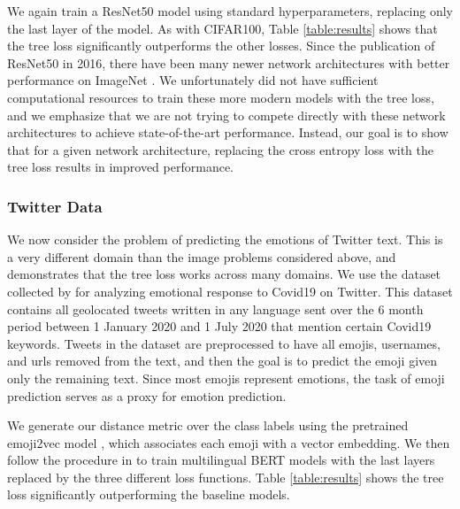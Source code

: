 \documentclass[twoside]{article}
\begin{document}
We again train a ResNet50 model \citep{He2016DeepRL} using standard hyperparameters, replacing only the last layer of the model.
As with CIFAR100, Table \ref{table:results} shows that the tree loss significantly outperforms the other losses.
Since the publication of ResNet50 in 2016,
there have been many newer network architectures with better performance on ImageNet \citep[e.g.][]{howard2017mobilenets,huang2017densely,pmlr-v97-tan19a}.
We unfortunately did not have sufficient computational resources to train these more modern models with the tree loss,
and we emphasize that we are not trying to compete directly with these network architectures to achieve state-of-the-art performance.
Instead, our goal is to show that for a given network architecture,
replacing the cross entropy loss with the tree loss results in improved performance.

\subsubsection{Twitter Data}

We now consider the problem of predicting the emotions of Twitter text.
This is a very different domain than the image problems considered above,
and demonstrates that the tree loss works across many domains.
We use the dataset collected by \citet{stoikos2020multilingual} for analyzing emotional response to Covid19 on Twitter.
This dataset contains all geolocated tweets written in any language sent over the 6 month period between 1 January 2020 and 1 July 2020 that mention certain Covid19 keywords.
Tweets in the dataset are preprocessed to have all emojis, usernames, and urls removed from the text,
and then the goal is to predict the emoji given only the remaining text.
Since most emojis represent emotions,
the task of emoji prediction serves as a proxy for emotion prediction.

We generate our distance metric over the class labels using the pretrained emoji2vec model \citep{Eisner2016emoji2vecLE},
which associates each emoji with a vector embedding.
We then follow the procedure in \citet{stoikos2020multilingual} to train multilingual BERT models \citep{Feng2020LanguageagnosticBS} with the last layers replaced by the three different loss functions.
Table \ref{table:results} shows the tree loss significantly outperforming the baseline models.
\end{document}
